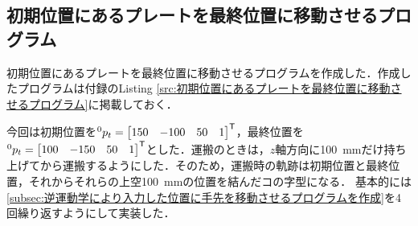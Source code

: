 \documentclass{ltjsarticle}
\begin{document}
\subsection{初期位置にあるプレートを最終位置に移動させるプログラム}\label{subsec:初期位置にあるプレートを最終位置に移動させるプログラム}
初期位置にあるプレートを最終位置に移動させるプログラムを作成した．作成したプログラムは付録のListing \ref{src:初期位置にあるプレートを最終位置に移動させるプログラム}に掲載しておく．

今回は初期位置を$^0p_t = \mqty[150 & -100 & 50 & 1]^\mathsf{T}$，最終位置を$^0p_t = \mqty[100 & -150 & 50 & 1]^\mathsf{T}$とした．運搬のときは，$z$軸方向に\SI{100}{\mm}だけ持ち上げてから運搬するようにした．そのため，運搬時の軌跡は初期位置と最終位置，それからそれらの上空\SI{100}{\mm}の位置を結んだコの字型になる．
基本的には\cref{subsec:逆運動学により入力した位置に手先を移動させるプログラムを作成}を4回繰り返すようにして実装した．
\end{document}
